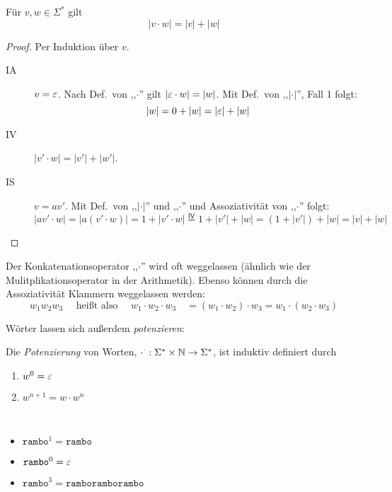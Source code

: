 \begin{lemma}
  Für $v,w \in \Sigma^*$ gilt
  \begin{displaymath}
    |v\cdot w| = |v| + |w|
  \end{displaymath}
\end{lemma}
\begin{proof}
  Per Induktion über $v$.
  \begin{description}
  \item[IA] $v = \varepsilon$.
    Nach Def.\ von ,,$\cdot$'' gilt $|\varepsilon \cdot w| = |w|$.
    Mit Def.\ von ,,$|\cdot|$'', Fall 1 folgt:
    \begin{displaymath}
     |w| = 0 + |w| = |\varepsilon| + |w|
   \end{displaymath}
 \item[IV] $|v' \cdot w| = |v'| + |w'|$.
 \item[IS] $v = av'$.
   Mit Def.\ von ,,$|\cdot|$'' und ,,$\cdot$'' und Assoziativität von ,,$\cdot$'' folgt:
   \begin{displaymath}
   |av'\cdot w| = |a(v'\cdot w)| = 1 + |v' \cdot w| \stackrel{\mathsf{IV}}{=} 1 + |v'| + |w| = (1 + |v'|) + |w| = |v| + |w|
   \end{displaymath}
  
  \end{description}
\end{proof}

Der Konkatenationsoperator ,,$\cdot$'' wird oft weggelassen (ähnlich wie der Mulitplikationsoperator in der Arithmetik).
Ebenso können durch die Assoziativität Klammern weggelassen werden:
\begin{displaymath}
  w_1w_2w_3 \quad \text{ heißt also } \quad w_1\cdot w_2\cdot w_3 \quad = (w_1 \cdot w_2) \cdot w_3 = w_1 \cdot (w_2 \cdot w_3)
\end{displaymath}

Wörter lassen sich außerdem \emph{potenzieren}:
\begin{Def}
  Die \emph{Potenzierung} von Worten, $\cdot ^ \cdot: \Sigma^*\times \mathbb{N} \to \Sigma^*$, ist induktiv definiert durch
  \begin{enumerate}
  \item $w^0 = \varepsilon$ 
  \item $w^{n+1} = w \cdot w^n$
  \end{enumerate}
\end{Def}
\begin{Bsp*} ~
  \begin{itemize}
  \item $\mathtt{rambo}^1 = \mathtt{rambo}$
  \item $\mathtt{rambo}^0 = \varepsilon$
  \item $\mathtt{rambo}^3 = \mathtt{ramboramborambo}$
  \end{itemize}
\end{Bsp*}

